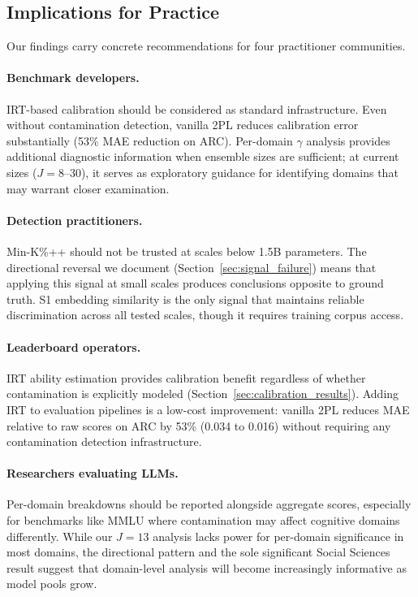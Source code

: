 \subsection{Implications for Practice}
\label{sec:implications}

Our findings carry concrete recommendations for four practitioner communities.

\paragraph{Benchmark developers.}
IRT-based calibration should be considered as standard infrastructure. Even without contamination detection, vanilla 2PL reduces calibration error substantially (53\% MAE reduction on ARC). Per-domain $\gamma$ analysis provides additional diagnostic information when ensemble sizes are sufficient; at current sizes ($J = 8$--$30$), it serves as exploratory guidance for identifying domains that may warrant closer examination.

\paragraph{Detection practitioners.}
Min-K\%++ should not be trusted at scales below 1.5B parameters. The directional reversal we document (Section~\ref{sec:signal_failure}) means that applying this signal at small scales produces conclusions opposite to ground truth. S1 embedding similarity is the only signal that maintains reliable discrimination across all tested scales, though it requires training corpus access.

\paragraph{Leaderboard operators.}
IRT ability estimation provides calibration benefit regardless of whether contamination is explicitly modeled (Section~\ref{sec:calibration_results}). Adding IRT to evaluation pipelines is a low-cost improvement: vanilla 2PL reduces MAE relative to raw scores on ARC by 53\% (0.034 to 0.016) without requiring any contamination detection infrastructure.

\paragraph{Researchers evaluating LLMs.}
Per-domain breakdowns should be reported alongside aggregate scores, especially for benchmarks like MMLU where contamination may affect cognitive domains differently. While our $J = 13$ analysis lacks power for per-domain significance in most domains, the directional pattern and the sole significant Social Sciences result suggest that domain-level analysis will become increasingly informative as model pools grow.

